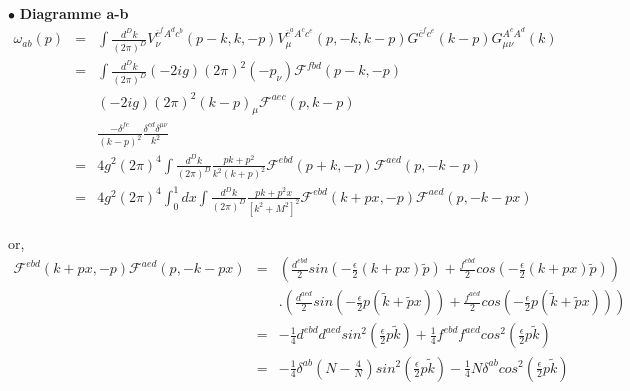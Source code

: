 \documentclass[a4paper,11pt]{article}
\theoremstyle{plain}
\theoremstyle{definition}
\theoremstyle{remark}
\numberwithin{equation}{section}
\numberwithin{equation}{subsection}
\numberwithin{figure}{section}
\begin{document}
$\bullet$ \textbf{Diagramme a-b}
 \begin{eqnarray}
  \omega_{ab}(p) &=&  \int  \frac{d^D k}{(2 \pi)^D}
V_{\nu}^{ \overline{c}^{f} A^{d} c^{b} } (p-k , k , -p )
V_{\mu}^{ \overline{c}^{a} A^{c} c^{e} } (p,-k,k-p )
G^{ \overline{c}^{f} c^{e} } (k-p)
G^{ A^{c} A^{d} }_{\mu \nu } (k)  \\
                               &=& \int  \frac{d^D k}{(2 \pi)^D}
(-2ig) (2 \pi)^2  (-p_{\nu}) \mathcal{F}^{fbd}(p-k , -p)  \nonumber \\
&&         (-2ig) (2 \pi)^2  (k-p)_{\mu} \mathcal{F}^{aec}(p , k-p) \nonumber \\
&&         \frac{-\delta^{fe}}{(k-p)^2}
\frac{\delta^{cd} \delta^{\mu \nu}}{k^2} \\
                               &=&  4 g^{2}  (2 \pi)^{4}  \int  \frac{d^D k}{(2 \pi)^D}
\frac{pk + p^2}{k^2(k+p)^2}
\mathcal{F}^{ebd}(p+k , -p)   \mathcal{F}^{aed}(p , -k-p)  \\
                               &=&  4 g^{2}  (2 \pi)^{4}
\int_ {0}^{1}  dx
\int  \frac{d^D k}{(2 \pi)^D}
\frac{pk + p^2x}{\left[ k^2 + M^2 \right]^2}
\mathcal{F}^{ebd}(k+px , -p)   \mathcal{F}^{aed}(p , -k-px)  
 \end{eqnarray}

\noindent
or,
\begin{eqnarray}
 \mathcal{F}^{ebd}(k+px , -p)   \mathcal{F}^{aed}(p , -k-px) &=&
\left(
\frac{d^{ebd}}{2}   sin \left( - \frac{\epsilon}{2}  ( k +px ) \tilde{p}    \right)   +    \frac{f^{ebd}}{2}   
cos \left(  - \frac{\epsilon}{2}  ( k +px ) \tilde{p}   \right)
\right) \nonumber \\
&&
.\left(
\frac{d^{aed}}{2}   sin \left(  - \frac{\epsilon}{2}  p ( \tilde{k}  + \tilde{p} x )   \right)   +    \frac{f^{aed}}{2}   
cos \left(  -\frac{\epsilon}{2} p ( \tilde{k}  + \tilde{p} x )   \right)
\right)  \\
                                                                                                 &=&
- \frac{1}{4} d^{ebd} d^{aed}  sin^{2} \left(  \frac{\epsilon}{2}  p \tilde{k}   \right)
+ \frac{1}{4} f^{ebd} f^{aed}  cos^{2} \left(  \frac{\epsilon}{2}  p \tilde{k}   \right) \\
                                                                                                 &=&
- \frac{1}{4}  \delta^{ab} \left( N-\frac{4}{N} \right)  sin^{2} \left(  \frac{\epsilon}{2}  p \tilde{k}   \right)
- \frac{1}{4} N \delta^{ab} cos^{2} \left(  \frac{\epsilon}{2}  p \tilde{k}   \right) \\
\end{eqnarray}
\end{document}
